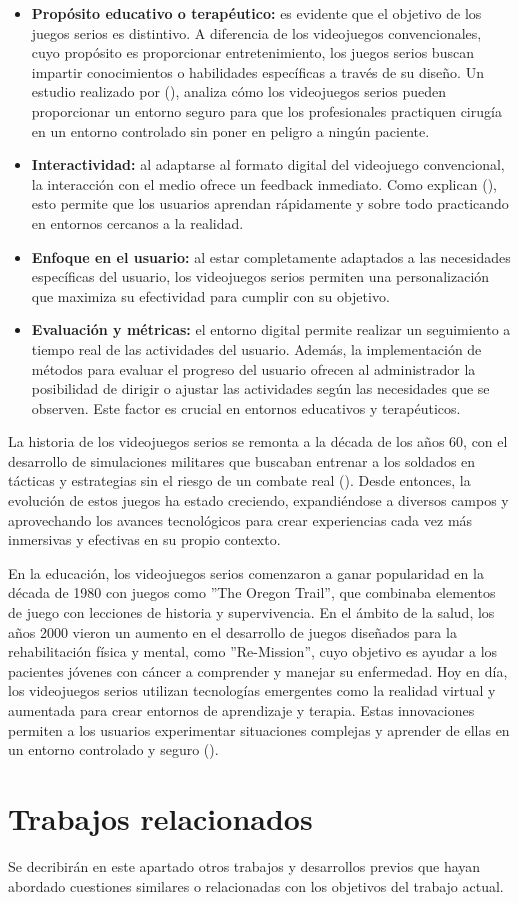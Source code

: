 \begin{itemize}
	\item \textbf{Propósito educativo o terapéutico:} es evidente que el objetivo de los juegos serios es distintivo. A diferencia de los videojuegos convencionales, cuyo propósito es proporcionar entretenimiento, los juegos serios buscan impartir conocimientos o habilidades específicas a través de su diseño. Un estudio realizado por \citeauthor{GRAAFLAND:2012} (\citeyear{GRAAFLAND:2012}), analiza cómo los videojuegos serios pueden proporcionar un entorno seguro para que los profesionales practiquen cirugía en un entorno controlado sin poner en peligro a ningún paciente.
	\item \textbf{Interactividad:} al adaptarse al formato digital del videojuego convencional, la interacción con el medio ofrece un feedback inmediato. Como explican \citeauthor{CONNOLLY:2012} (\citeyear{CONNOLLY:2012}), esto permite que los usuarios aprendan rápidamente y sobre todo practicando en entornos cercanos a la realidad.
	\item \textbf{Enfoque en el usuario:} al estar completamente adaptados a las necesidades específicas del usuario, los videojuegos serios permiten una personalización que maximiza su efectividad para cumplir con su objetivo.
	\item \textbf{Evaluación y métricas:} el entorno digital permite realizar un seguimiento a tiempo real de las actividades del usuario. Además, la implementación de métodos para evaluar el progreso del usuario ofrecen al administrador la posibilidad de dirigir o ajustar las actividades según las necesidades que se observen. Este factor es crucial en entornos educativos y terapéuticos.
\end{itemize}

La historia de los videojuegos serios se remonta a la década de los años 60, con el desarrollo de simulaciones militares que buscaban entrenar a los soldados en tácticas y estrategias sin el riesgo de un combate real (\cite{SAWYER:2002}). Desde entonces, la evolución de estos juegos ha estado creciendo, expandiéndose a diversos campos y aprovechando los avances tecnológicos para crear experiencias cada vez más inmersivas y efectivas en su propio contexto. 

En la educación, los videojuegos serios comenzaron a ganar popularidad en la década de 1980 con juegos como ''The Oregon Trail'', que combinaba elementos de juego con lecciones de historia y supervivencia. En el ámbito de la salud, los años 2000 vieron un aumento en el desarrollo de juegos diseñados para la rehabilitación física y mental, como ''Re-Mission'', cuyo objetivo es ayudar a los pacientes jóvenes con cáncer a comprender y manejar su enfermedad. Hoy en día, los videojuegos serios utilizan tecnologías emergentes como la realidad virtual y aumentada para crear entornos de aprendizaje y terapia. Estas innovaciones permiten a los usuarios experimentar situaciones complejas y aprender de ellas en un entorno controlado y seguro (\cite{FREITAS:2011}).

\section{Trabajos relacionados}

Se decribirán en este apartado otros trabajos y desarrollos previos que hayan abordado cuestiones similares o relacionadas con los objetivos del trabajo actual.

